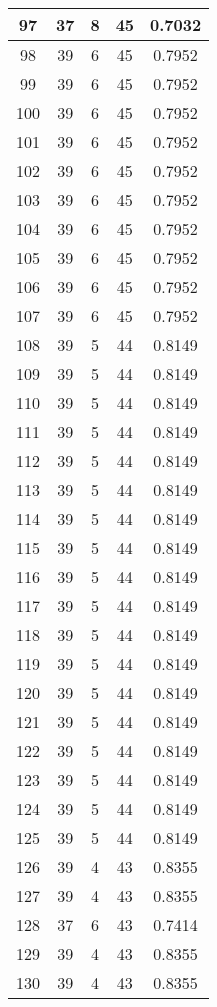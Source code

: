 \documentclass[letterpaper, 12pt]{article}
\begin{document}
\begin{longtable}{|c|c|c|c|c|}
\hline
97 & 37 & 8 & 45 & 0.7032 \\
\hline
98 & 39 & 6 & 45 & 0.7952 \\
\hline
99 & 39 & 6 & 45 & 0.7952 \\
\hline
100 & 39 & 6 & 45 & 0.7952 \\
\hline
101 & 39 & 6 & 45 & 0.7952 \\
\hline
102 & 39 & 6 & 45 & 0.7952 \\
\hline
103 & 39 & 6 & 45 & 0.7952 \\
\hline
104 & 39 & 6 & 45 & 0.7952 \\
\hline
105 & 39 & 6 & 45 & 0.7952 \\
\hline
106 & 39 & 6 & 45 & 0.7952 \\
\hline
107 & 39 & 6 & 45 & 0.7952 \\
\hline
108 & 39 & 5 & 44 & 0.8149 \\
\hline
109 & 39 & 5 & 44 & 0.8149 \\
\hline
110 & 39 & 5 & 44 & 0.8149 \\
\hline
111 & 39 & 5 & 44 & 0.8149 \\
\hline
112 & 39 & 5 & 44 & 0.8149 \\
\hline
113 & 39 & 5 & 44 & 0.8149 \\
\hline
114 & 39 & 5 & 44 & 0.8149 \\
\hline
115 & 39 & 5 & 44 & 0.8149 \\
\hline
116 & 39 & 5 & 44 & 0.8149 \\
\hline
117 & 39 & 5 & 44 & 0.8149 \\
\hline
118 & 39 & 5 & 44 & 0.8149 \\
\hline
119 & 39 & 5 & 44 & 0.8149 \\
\hline
120 & 39 & 5 & 44 & 0.8149 \\
\hline
121 & 39 & 5 & 44 & 0.8149 \\
\hline
122 & 39 & 5 & 44 & 0.8149 \\
\hline
123 & 39 & 5 & 44 & 0.8149 \\
\hline
124 & 39 & 5 & 44 & 0.8149 \\
\hline
125 & 39 & 5 & 44 & 0.8149 \\
\hline
126 & 39 & 4 & 43 & 0.8355 \\
\hline
127 & 39 & 4 & 43 & 0.8355 \\
\hline
128 & 37 & 6 & 43 & 0.7414 \\
\hline
129 & 39 & 4 & 43 & 0.8355 \\
\hline
130 & 39 & 4 & 43 & 0.8355 \\

\end{longtable}
\end{document}

